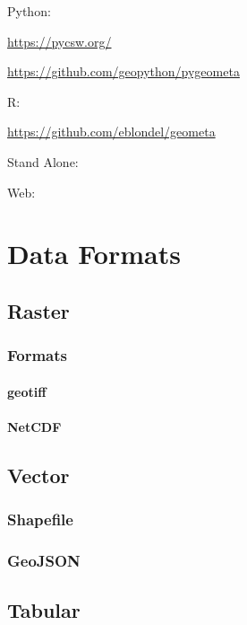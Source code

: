 \documentclass[
]{book}
\begin{document}
Python:

\url{https://pycsw.org/}

\url{https://github.com/geopython/pygeometa}

R:

\url{https://github.com/eblondel/geometa}

Stand Alone:

Web:

\hypertarget{data-formats}{%
\section{Data Formats}\label{data-formats}}

\hypertarget{raster}{%
\subsection{Raster}\label{raster}}

\hypertarget{formats}{%
\subsubsection{Formats}\label{formats}}

\hypertarget{geotiff}{%
\paragraph{geotiff}\label{geotiff}}

\hypertarget{netcdf}{%
\paragraph{NetCDF}\label{netcdf}}

\hypertarget{vector}{%
\subsection{Vector}\label{vector}}

\hypertarget{shapefile}{%
\subsubsection{Shapefile}\label{shapefile}}

\hypertarget{geojson}{%
\subsubsection{GeoJSON}\label{geojson}}

\hypertarget{tabular}{%
\subsection{Tabular}\label{tabular}}
\end{document}
